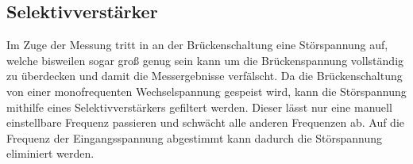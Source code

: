 \subsection{Selektivverstärker}
Im Zuge der Messung tritt in an der Brückenschaltung eine Störspannung auf, welche bisweilen sogar groß genug sein kann um die Brückenspannung vollständig zu überdecken und damit die Messergebnisse verfälscht. Da die Brückenschaltung von einer monofrequenten Wechselspannung gespeist wird, kann die Störspannung mithilfe eines Selektivverstärkers gefiltert werden. Dieser lässt nur eine manuell einstellbare Frequenz passieren und schwächt alle anderen Frequenzen ab. Auf die Frequenz der Eingangsspannung abgestimmt kann dadurch die Störspannung eliminiert werden. 
